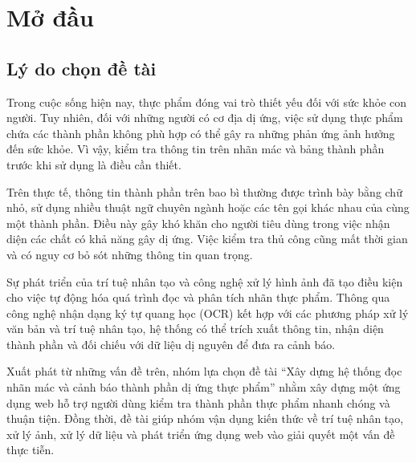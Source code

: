 

\chapter{Mở đầu}
\label{ch:modau}

\setlength{\parindent}{0pt}
\setlength{\parskip}{4pt}


\section{Lý do chọn đề tài}

Trong cuộc sống hiện nay, thực phẩm đóng vai trò thiết yếu đối với sức khỏe con người. Tuy nhiên, đối với những người có cơ địa dị ứng, việc sử dụng thực phẩm chứa các thành phần không phù hợp có thể gây ra những phản ứng ảnh hưởng đến sức khỏe. Vì vậy, kiểm tra thông tin trên nhãn mác và bảng thành phần trước khi sử dụng là điều cần thiết.

Trên thực tế, thông tin thành phần trên bao bì thường được trình bày bằng chữ nhỏ, sử dụng nhiều thuật ngữ chuyên ngành hoặc các tên gọi khác nhau của cùng một thành phần. Điều này gây khó khăn cho người tiêu dùng trong việc nhận diện các chất có khả năng gây dị ứng. Việc kiểm tra thủ công cũng mất thời gian và có nguy cơ bỏ sót những thông tin quan trọng.

Sự phát triển của trí tuệ nhân tạo và công nghệ xử lý hình ảnh đã tạo điều kiện cho việc tự động hóa quá trình đọc và phân tích nhãn thực phẩm. Thông qua công nghệ nhận dạng ký tự quang học (OCR) kết hợp với các phương pháp xử lý văn bản và trí tuệ nhân tạo, hệ thống có thể trích xuất thông tin, nhận diện thành phần và đối chiếu với dữ liệu dị nguyên để đưa ra cảnh báo.

Xuất phát từ những vấn đề trên, nhóm lựa chọn đề tài “Xây dựng hệ thống đọc nhãn mác và cảnh báo thành phần dị ứng thực phẩm” nhằm xây dựng một ứng dụng web hỗ trợ người dùng kiểm tra thành phần thực phẩm nhanh chóng và thuận tiện. Đồng thời, đề tài giúp nhóm vận dụng kiến thức về trí tuệ nhân tạo, xử lý ảnh, xử lý dữ liệu và phát triển ứng dụng web vào giải quyết một vấn đề thực tiễn.


